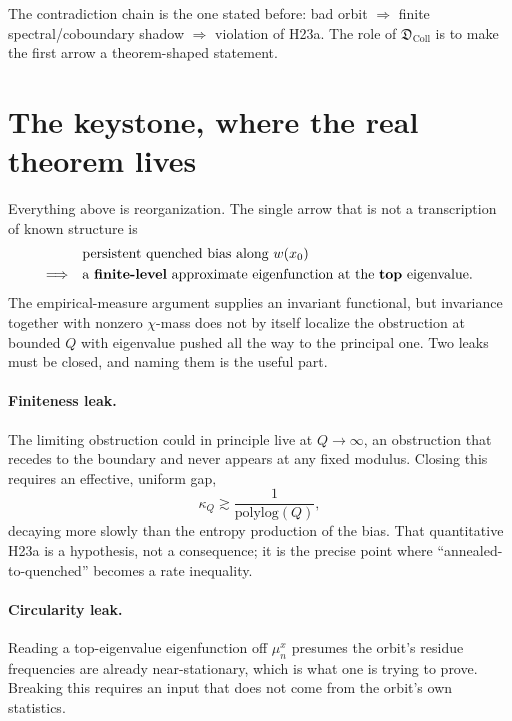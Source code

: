 \documentclass[11pt]{article}
\newcommand{\Dcoll}{\mathfrak{D}_{\mathrm{Coll}}}
\theoremstyle{remark}
\begin{document}
The contradiction chain is the one stated before: bad orbit $\Rightarrow$ finite
spectral/coboundary shadow $\Rightarrow$ violation of \textsf{H23a}. The role of $\Dcoll$ is
to make the first arrow a theorem-shaped statement.

\section{The keystone, where the real theorem lives}

Everything above is reorganization. The single arrow that is not a transcription of known
structure is
\[
\begin{aligned}
&\text{persistent quenched bias along } w(x_0)\\
\Longrightarrow\quad &\text{a \textbf{finite-level} approximate eigenfunction at the \textbf{top} eigenvalue}.
\end{aligned}
\]
The empirical-measure argument supplies an invariant functional, but invariance together
with nonzero $\chi$-mass does not by itself localize the obstruction at bounded $Q$ with
eigenvalue pushed all the way to the principal one. Two leaks must be closed, and naming
them is the useful part.

\paragraph{Finiteness leak.} The limiting obstruction could in principle live at
$Q\to\infty$, an obstruction that recedes to the boundary and never appears at any fixed
modulus. Closing this requires an effective, uniform gap,
\[
\kappa_Q \gtrsim \frac{1}{\mathrm{polylog}(Q)},
\]
decaying more slowly than the entropy production of the bias. That quantitative
\textsf{H23a} is a hypothesis, not a consequence; it is the precise point where
``annealed-to-quenched'' becomes a rate inequality.

\paragraph{Circularity leak.} Reading a top-eigenvalue eigenfunction off $\mu_n^x$
presumes the orbit's residue frequencies are already near-stationary, which is what one is
trying to prove. Breaking this requires an input that does not come from the orbit's own
statistics.
\end{document}
